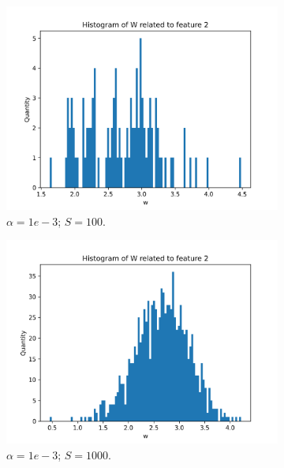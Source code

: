 \documentclass{article}
\begin{document}
\begin{figure}
\begin{subfigure}[t]{0.24\textwidth}
    \includegraphics[width=\linewidth]{hist_feat1_10000_sample_100.png}
    \caption{$\alpha = 1e-3$; $S = 100$.}
  \end{subfigure}
  \hfill
  \begin{subfigure}[t]{0.24\textwidth}
    \centering
    \includegraphics[width=\linewidth]{hist_feat1_10000_sample_1000.png}
    \caption{$\alpha = 1e-3$; $S = 1000$.}
  \end{subfigure}
  \hfill
  \begin{subfigure}[t]{0.24\textwidth}
    \centering

\end{subfigure}
\end{figure}
\end{document}
